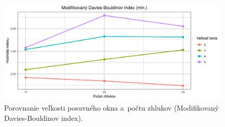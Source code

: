 \documentclass[a4paper,twoside,slovak,12pt,appendix]{article}
\begin{document}
\begin{appendices}
\begin{figure}[htbp]
  \centering
  \includegraphics[width=\textwidth]{cvi/dtw_basic_workdays_sparse/201904291110-DBstar-dtw_basic_workdays_sparse.png}
  \caption{Porovnanie veľkosti posuvného okna a~počtu zhlukov (Modifikovaný Davies-Bouldinov index).}
\end{figure}


\end{appendices}
\end{document}

